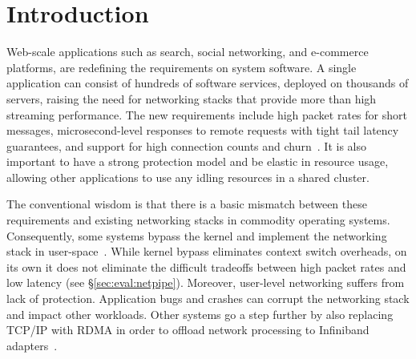 
\section{Introduction}
\label{sec:intro}


Web-scale applications such as search, social networking, and
e-commerce platforms, are redefining the requirements on system
software. A single application can consist of hundreds of software
services, deployed on thousands of servers, raising the need for
networking stacks that provide more than high streaming performance.
The new requirements include high packet rates for short messages,
microsecond-level responses to remote requests with tight tail latency
guarantees, and support for high connection counts and
churn~\cite{Atikoglu:2012:WAL,DBLP:journals/cacm/DeanB13,DBLP:conf/nsdi/NishtalaFGKLLMPPSSTV13}.
It is also important to have a strong protection model and be elastic
in resource usage, allowing other applications to use any idling
resources in a shared
cluster. %

The conventional wisdom is that there is a basic mismatch between
these requirements and existing networking stacks in commodity
operating systems. Consequently, some systems bypass the kernel and
implement the networking stack in
user-space~\cite{jeong2014mtcp,DBLP:conf/cloud/KapoorPTVV12,sandstorm,openonload,DBLP:conf/sigcomm/ThekkathNML93}.
While kernel bypass eliminates context switch overheads, on its own it
does not eliminate the difficult tradeoffs between high packet rates
and low latency (see \S\ref{sec:eval:netpipe}). Moreover, user-level networking
suffers from lack of protection. Application bugs and crashes can
corrupt the networking stack and impact other workloads.
Other systems go a step further by also replacing TCP/IP with RDMA in
order to offload network processing to Infiniband
adapters~\cite{dragojevic14farm,DBLP:conf/icpp/JoseSLZHWIOWSP11,mitchell:rdma,DBLP:conf/sosp/OngaroRSOR11}.



